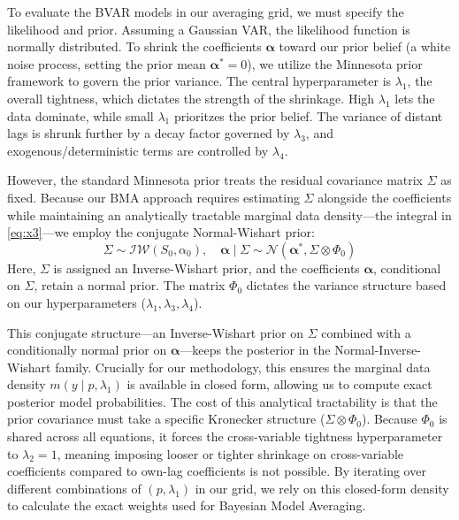 \documentclass[12pt, a4paper]{article}
\begin{document}
To evaluate the BVAR models in our averaging grid, we must specify the likelihood and prior. Assuming a Gaussian VAR, the likelihood function is normally distributed. To shrink the coefficients $\boldsymbol{\alpha}$ toward our prior belief (a white noise process, setting the prior mean $\boldsymbol{\alpha}^{*} = 0$), we utilize the Minnesota prior framework to govern the prior variance. The central hyperparameter is $\lambda_1$, the overall tightness, which dictates the strength of the shrinkage. High $\lambda_1$ lets the data dominate, while small $\lambda_1$ prioritzes the prior belief. The variance of distant lags is shrunk further by a decay factor governed by $\lambda_3$, and exogenous/deterministic terms are controlled by $\lambda_4$.

However, the standard Minnesota prior treats the residual covariance matrix $\Sigma$ as fixed. Because our BMA approach requires estimating $\Sigma$ alongside the coefficients while maintaining an analytically tractable marginal data density—the integral in \eqref{eq:x3}—we employ the conjugate Normal-Wishart prior:
\begin{equation} \label{eq:normal_wishart}
\Sigma \sim \mathcal{IW}(S_0, \alpha_0), \quad \boldsymbol{\alpha} \mid \Sigma \sim \mathcal{N}(\boldsymbol{\alpha}^*, \Sigma \otimes \Phi_0)
\end{equation}
Here, $\Sigma$ is assigned an Inverse-Wishart prior, and the coefficients $\boldsymbol{\alpha}$, conditional on $\Sigma$, retain a normal prior. The matrix $\Phi_0$ dictates the variance structure based on our hyperparameters ($\lambda_1, \lambda_3, \lambda_4$). 

This conjugate structure—an Inverse-Wishart prior on $\Sigma$ combined with a conditionally normal prior on $\boldsymbol{\alpha}$—keeps the posterior in the Normal-Inverse-Wishart family. Crucially for our methodology, this ensures the marginal data density $m(y \mid p, \lambda_1)$ is available in closed form, allowing us to compute exact posterior model probabilities. The cost of this analytical tractability is that the prior covariance must take a specific Kronecker structure ($\Sigma \otimes \Phi_0$). Because $\Phi_0$ is shared across all equations, it forces the cross-variable tightness hyperparameter to $\lambda_2 = 1$, meaning imposing looser or tighter shrinkage on cross-variable coefficients compared to own-lag coefficients is not possible. By iterating over different combinations of $(p, \lambda_1)$ in our grid, we rely on this closed-form density to calculate the exact weights used for Bayesian Model Averaging.
\end{document}
